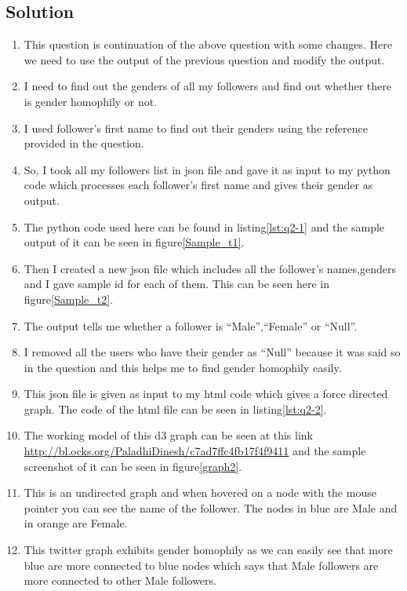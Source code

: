 \subsection{Solution}
\begin{enumerate}
\item This question is continuation of the above question with some changes. Here we need to use the output of the previous question and modify the output.
\item I need to find out the genders of all my followers and find out whether there is gender homophily or not.
\item I used follower's first name to find out their genders using the reference provided in the question.
\item So, I took all my followers list in json file and gave it as input to my python code which processes each follower's first name and gives their gender as output.
\item The python code used here can be found in listing\ref{lst:q2-1} and the sample output of it can be seen in figure\ref{Sample_t1}.
\item Then I created a new json file which includes all the follower's names,genders and I gave sample id for each of them. This can be seen here in figure\ref{Sample_t2}.
\item The output tells me whether a follower is ``Male'',``Female'' or ``Null''.
\item I removed all the users who have their gender as ``Null'' because it was said so in the question and this helps me to find gender homophily easily.
\item This json file is given as input to my html code which gives a force directed graph. The code of the html file can be seen in listing\ref{lst:q2-2}.
\item The working model of this d3 graph can be seen at this link \url{http://bl.ocks.org/PaladhiDinesh/c7ad7ffc4fb17f4f9411} and the sample screenshot of it can be seen in figure\ref{graph2}.
\item This is an undirected graph and when hovered on a node with the mouse pointer you can see the name of the follower. The nodes in blue are Male and in orange are Female.
\item This twitter graph exhibits gender homophily as we can easily see that more blue are more connected to blue nodes which says that Male followers are more connected to other Male followers.

\end{enumerate}

